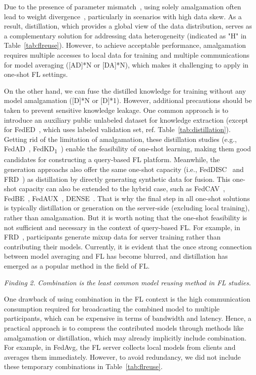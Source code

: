 Due to the presence of parameter mismatch~\cite{yu2021fed2, wang2020federated, yurochkin2019statistical}, using solely amalgamation often lead to weight divergence~\cite{Li2020On, tan2022towards}, particularly in scenarios with high data skew. 
As a result, distillation, which provides a global view of the data distribution, serves as a complementary solution for addressing data heterogeneity (indicated as "H" in Table~\ref{tab:flreuse}).
However, to achieve acceptable performance, amalgamation requires multiple accesses to local data for training and multiple communications for model averaging ([AD]*N or [DA]*N), which makes it challenging to apply in one-shot FL settings.

On the other hand, we can fuse the distilled knowledge for training without any model amalgamation ([D]*N or [D]*1).
However, additional precautions should be taken to prevent sensitive knowledge leakage.
One common approach is to introduce an auxiliary public unlabeled dataset for knowledge extraction (except for FedED~\cite{sui2020feded}, which uses labeled validation set, ref. Table~\ref{tab:distillation}).
Getting rid of the limitation of amalgamation, these distillation studies (e.g., FedAD~\cite{gong2021ensemble}, FedKD\textsubscript{1}~\cite{gong2022preserving}) enable the feasibility of one-shot learning, making them good candidates for constructing a query-based FL platform.
Meanwhile, the generation approachs also offer the same one-shot capacity (i.e., FedDISC~\cite{yang2023exploring} and FRD~\cite{cha2019federated}) as distillation by directly generating synthetic data for fusion.
This one-shot capacity can also be extended to the hybrid case, such as FedCAV~\cite{heinbaugh2023data}, FedBE~\cite{chen2020fedbe}, FedAUX~\cite{sattler2021fedaux}, DENSE~\cite{zhang2022dense}.
That is why the final step in all one-shot solutions is typically distillation or generation on the server-side (excluding local training), rather than amalgamation.
But it is worth noting that the one-shot feasibility is not sufficient and necessary in the context of query-based FL.
For example, in FRD~\cite{cha2019federated}, participants generate mixup data for server training rather than contributing their models.
Currently, it is evident that the once strong connection between model averaging and FL has become blurred, and distillation has emerged as a popular method in the field of FL.

\textit{Finding 2. Combination is the least common model reusing method in FL studies.}

One drawback of using combination in the FL context is the high communication consumption required for broadcasting the combined model to multiple participants, which can be expensive in terms of bandwidth and latency.
Hence, a practical approach is to compress the contributed models through methods like amalgamation or distillation, which may already implicitly include combination. 
For example, in FedAvg, the FL server collects local models from clients and averages them immediately. 
However, to avoid redundancy, we did not include these temporary combinations in Table~\ref{tab:flreuse}.

